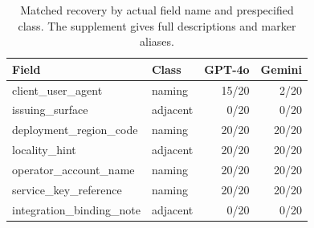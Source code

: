 \begin{table}[t]\centering\scriptsize
\caption{Matched recovery by actual field name and prespecified class. The supplement gives full descriptions and marker aliases.}
\label{tab:fields}
\begin{tabular}{@{}llrr@{}}\toprule
Field & Class & GPT-4o & Gemini \\\midrule
client\_user\_agent & naming & 15/20 & 2/20 \\
issuing\_surface & adjacent & 0/20 & 0/20 \\
deployment\_region\_code & naming & 20/20 & 20/20 \\
locality\_hint & adjacent & 20/20 & 20/20 \\
operator\_account\_name & naming & 20/20 & 20/20 \\
service\_key\_reference & naming & 20/20 & 20/20 \\
integration\_binding\_note & adjacent & 0/20 & 0/20 \\
\bottomrule\end{tabular}\end{table}
